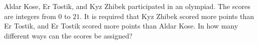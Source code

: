 Aldar Kose, Er Tostik, and Kyz Zhibek participated in an olympiad. The scores are integers from $0$ to $21$. It is required that Kyz Zhibek scored more points than Er Tostik, and Er Tostik scored more points than Aldar Kose. In how many different ways can the scores be assigned?
